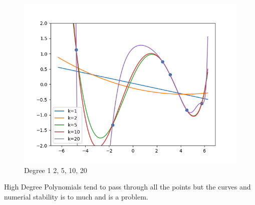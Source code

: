 \begin{answer}

\begin{figure}[h!]
\centering
  \includegraphics[width=.7\linewidth]{featuremaps/5e.png}
\caption{Degree 1 2, 5, 10, 20}
\label{fig:test}
\end{figure}
High Degree Polynomials tend to pass through all the points but the curves and numerial stability is to much and is a problem.
\end{answer}
